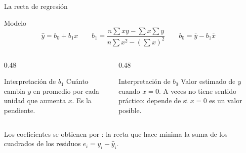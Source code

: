 \documentclass[aspectratio=169,10pt]{beamer}
\begin{document}

\begin{frame}{La recta de regresión}
  \begin{block}{Modelo}
    \[ \hat{y}=b_0+b_1 x \qquad
       b_1=\frac{n\sum xy-\sum x\sum y}{n\sum x^{2}-(\sum x)^{2}} \qquad
       b_0=\bar{y}-b_1\bar{x} \]
  \end{block}

  \vspace{0.2cm}
  \begin{columns}[T,onlytextwidth]
    \begin{column}{0.48\textwidth}
      \begin{exampleblock}{Interpretación de $b_1$}
        \footnotesize
        Cuánto cambia $y$ en promedio por cada unidad que aumenta $x$. Es la
        pendiente.
      \end{exampleblock}
    \end{column}
    \begin{column}{0.48\textwidth}
      \begin{exampleblock}{Interpretación de $b_0$}
        \footnotesize
        Valor estimado de $y$ cuando $x=0$. A veces no tiene sentido práctico:
        depende de si $x=0$ es un valor posible.
      \end{exampleblock}
    \end{column}
  \end{columns}

  \vspace{0.2cm}
  {\footnotesize\color{uniGris} Los coeficientes se obtienen por
  : la recta que hace mínima la suma de los cuadrados
  de los residuos $e_i=y_i-\hat{y}_i$.}
\end{frame}
\end{document}
